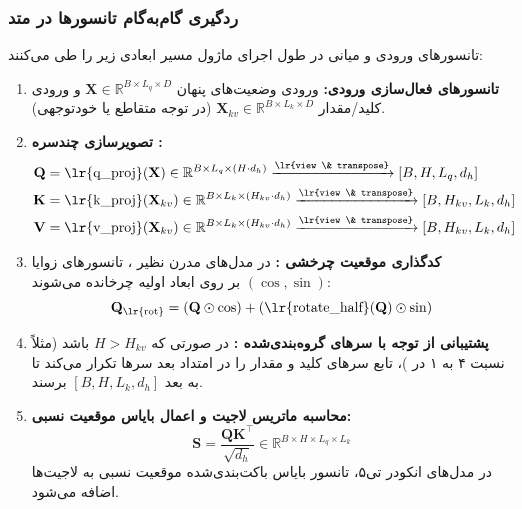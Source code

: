 \subsubsection*{ردگیری گام‌به‌گام تانسورها در متد }
تانسورهای ورودی و میانی در طول اجرای ماژول مسیر ابعادی زیر را طی می‌کنند:
\begin{enumerate}
    \item \textbf{تانسورهای فعال‌سازی ورودی:} ورودی وضعیت‌های پنهان $\mathbf{X} \in \mathbb{R}^{B \times L_q \times D}$ و ورودی کلید/مقدار $\mathbf{X}_{kv} \in \mathbb{R}^{B \times L_k \times D}$ (در توجه متقاطع یا خودتوجهی).
    \item \textbf{تصویرسازی چندسره :}
    \begin{align}
    \mathbf{Q} &= \text{\lr{q\_proj}}(\mathbf{X}) \in \mathbb{R}^{B \times L_q \times (H \cdot d_h)} \xrightarrow{\text{\lr{view \& transpose}}} [B, H, L_q, d_h] \\
    \mathbf{K} &= \text{\lr{k\_proj}}(\mathbf{X}_{kv}) \in \mathbb{R}^{B \times L_k \times (H_{kv} \cdot d_h)} \xrightarrow{\text{\lr{view \& transpose}}} [B, H_{kv}, L_k, d_h] \\
    \mathbf{V} &= \text{\lr{v\_proj}}(\mathbf{X}_{kv}) \in \mathbb{R}^{B \times L_k \times (H_{kv} \cdot d_h)} \xrightarrow{\text{\lr{view \& transpose}}} [B, H_{kv}, L_k, d_h]
    \end{align}
    \item \textbf{کدگذاری موقعیت چرخشی :} در مدل‌های مدرن نظیر ، تانسورهای زوایا $(\cos, \sin)$ بر روی ابعاد اولیه چرخانده می‌شوند:
    \begin{equation}
    \mathbf{Q}_{\text{\lr{rot}}} = (\mathbf{Q} \odot \cos) + (\text{\lr{rotate\_half}}(\mathbf{Q}) \odot \sin)
    \end{equation}
    \item \textbf{پشتیبانی از توجه با سرهای گروه‌بندی‌شده :} در صورتی که $H > H_{kv}$ باشد (مثلاً نسبت ۴ به ۱ در )، تابع  سرهای کلید و مقدار را در امتداد بعد سرها تکرار می‌کند تا به بعد $[B, H, L_k, d_h]$ برسند.
    \item \textbf{محاسبه ماتریس لاجیت و اعمال بایاس موقعیت نسبی:}
    \begin{equation}
    \mathbf{S} = \frac{\mathbf{Q} \mathbf{K}^\top}{\sqrt{d_h}} \in \mathbb{R}^{B \times H \times L_q \times L_k}
    \end{equation}
    در مدل‌های انکودر تی۵، تانسور بایاس باکت‌بندی‌شده موقعیت نسبی  به لاجیت‌ها اضافه می‌شود.

\end{enumerate}
